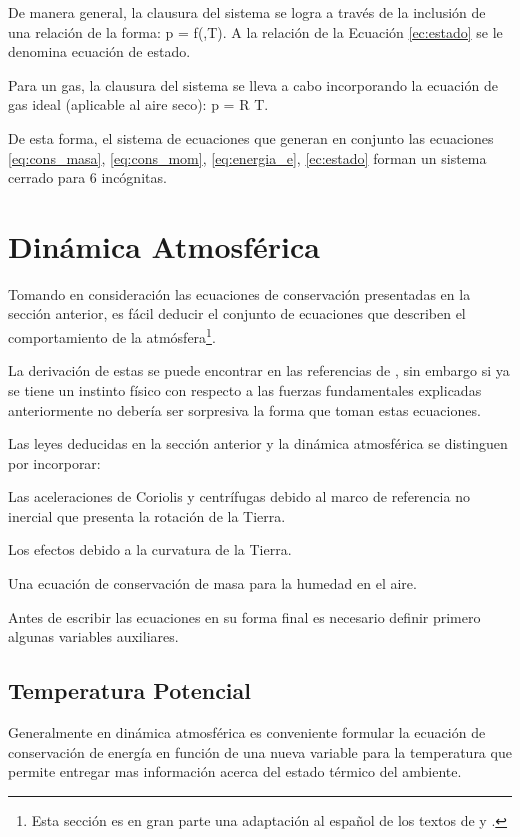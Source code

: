 De manera general, la clausura del sistema se logra a través de la inclusión de una relación de la forma:
\be\label{ec:estado}
p = f(\rho,T).
\ee 
A la relación de la Ecuación \ref{ec:estado} se le denomina ecuación de estado.

Para un gas, la clausura del sistema se lleva a cabo incorporando la ecuación de gas ideal (aplicable al aire seco):
\be \label{eq:gas_ideal}
p = \rho R T.
\ee

De esta forma, el sistema de ecuaciones que generan en conjunto las ecuaciones \ref{eq:cons_masa}, \ref{eq:cons_mom}, \ref{eq:energia_e}, \ref{ec:estado} forman un sistema cerrado para 6 incógnitas.
\newpage
\section{Dinámica Atmosférica}
Tomando en consideración las ecuaciones de conservación presentadas en la sección anterior, es fácil deducir el conjunto de ecuaciones que describen el comportamiento de la atmósfera\footnote{Esta sección es en gran parte una adaptación al español de los textos de \cite{holton1992introduction,jacobson2005fundamentals} y \cite{warner2010numerical}.}. 

La derivación de estas se puede encontrar en las referencias de \cite{holton1992introduction,jacobson2005fundamentals}, sin embargo si ya se tiene un instinto físico con respecto a las fuerzas fundamentales explicadas anteriormente no debería ser sorpresiva la forma que toman estas ecuaciones. 

Las leyes deducidas en la sección anterior y la dinámica atmosférica se distinguen por incorporar:
\begin{enumerate*}
	\item Las aceleraciones de Coriolis y centrífugas debido al marco de referencia no inercial que presenta la rotación de la Tierra.
	\item Los efectos debido a la curvatura de la Tierra.
	\item Una ecuación de conservación de masa para la humedad en el aire.
\end{enumerate*}

Antes de escribir las ecuaciones en su forma final es necesario definir primero algunas variables auxiliares.
\subsection{Temperatura Potencial}
Generalmente en dinámica atmosférica es conveniente formular la ecuación de conservación de energía en función de una nueva variable para la temperatura que permite entregar mas información acerca del estado térmico del ambiente. 

